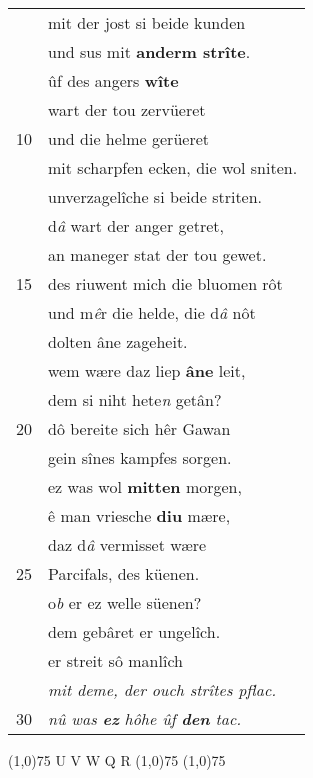 \documentclass[8pt,a4paper,notitlepage]{article}
\begin{document}
\begin{table}[ht]
\begin{minipage}[t]{0.5\linewidth}
\begin{tabular}{rl}
 & mit der jost si beide kunden\\ 
 & und sus mit \textbf{anderm strîte}.\\ 
 & ûf des angers \textbf{wîte}\\ 
 & wart der tou zervüeret\\ 
10 & und die helme gerüeret\\ 
 & mit scharpfen ecken, die wol sniten.\\ 
 & unverzagelîche si beide striten.\\ 
 & d\textit{â} wart der anger getret,\\ 
 & an maneger stat der tou gewet.\\ 
15 & des riuwent mich die bluomen rôt\\ 
 & und m\textit{ê}r die helde, die d\textit{â} nôt\\ 
 & dolten âne zageheit.\\ 
 & wem wære daz liep \textbf{âne} leit,\\ 
 & dem si niht hete\textit{n} getân?\\ 
20 & dô bereite sich hêr Gawan\\ 
 & gein sînes kampfes sorgen.\\ 
 & ez was wol \textbf{mitten} morgen,\\ 
 & ê man vriesche \textbf{diu} mære,\\ 
 & daz d\textit{â} vermisset wære\\ 
25 & Parcifals, des küenen.\\ 
 & o\textit{b} er ez welle süenen?\\ 
 & dem gebâret er ungelîch.\\ 
 & er streit sô manlîch\\ 
 & \textit{mit deme, der ouch strîtes pflac.}\\ 
30 & \textit{nû was \textbf{ez} hôhe ûf \textbf{den} tac.}\\ 
\end{tabular}
\scriptsize
\line(1,0){75} \newline
U V W Q R \newline
\line(1,0){75} \newline
\newline
\line(1,0){75} \newline

\end{minipage}
\end{table}
\end{document}
